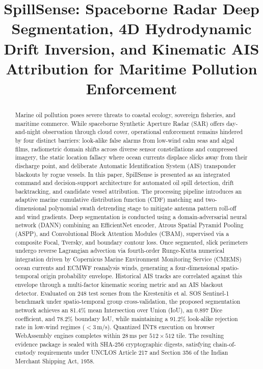 \documentclass[conference]{IEEEtran}
\begin{document}
\title{SpillSense: Spaceborne Radar Deep Segmentation, 4D Hydrodynamic Drift Inversion, and Kinematic AIS Attribution for Maritime Pollution Enforcement}

\author{
}

\maketitle

\begin{abstract}
Marine oil pollution poses severe threats to coastal ecology, sovereign fisheries, and maritime commerce. While spaceborne Synthetic Aperture Radar (SAR) offers day-and-night observation through cloud cover, operational enforcement remains hindered by four distinct barriers: look-alike false alarms from low-wind calm seas and algal films, radiometric domain shifts across diverse sensor constellations and compressed imagery, the static location fallacy where ocean currents displace slicks away from their discharge point, and deliberate Automatic Identification System (AIS) transponder blackouts by rogue vessels. In this paper, SpillSense is presented as an integrated command and decision-support architecture for automated oil spill detection, drift backtracking, and candidate vessel attribution. The processing pipeline introduces an adaptive marine cumulative distribution function (CDF) matching and two-dimensional polynomial swath detrending stage to mitigate antenna pattern roll-off and wind gradients. Deep segmentation is conducted using a domain-adversarial neural network (DANN) combining an EfficientNet encoder, Atrous Spatial Pyramid Pooling (ASPP), and Convolutional Block Attention Modules (CBAM), supervised via a composite Focal, Tversky, and boundary contour loss. Once segmented, slick perimeters undergo reverse Lagrangian advection via fourth-order Runge-Kutta numerical integration driven by Copernicus Marine Environment Monitoring Service (CMEMS) ocean currents and ECMWF reanalysis winds, generating a four-dimensional spatio-temporal origin probability envelope. Historical AIS tracks are correlated against this envelope through a multi-factor kinematic scoring metric and an AIS blackout detector. Evaluated on 248 test scenes from the Krestenitis et al. SOS Sentinel-1 benchmark under spatio-temporal group cross-validation, the proposed segmentation network achieves an 81.4\% mean Intersection over Union (IoU), an 0.897 Dice coefficient, and 78.2\% boundary IoU, while maintaining a 91.2\% look-alike rejection rate in low-wind regimes ($<3$\,m/s). Quantized INT8 execution on browser WebAssembly engines completes within 28\,ms per $512\times512$ tile. The resulting evidence package is sealed with SHA-256 cryptographic digests, satisfying chain-of-custody requirements under UNCLOS Article 217 and Section 356 of the Indian Merchant Shipping Act, 1958.
\end{abstract}
\end{document}

